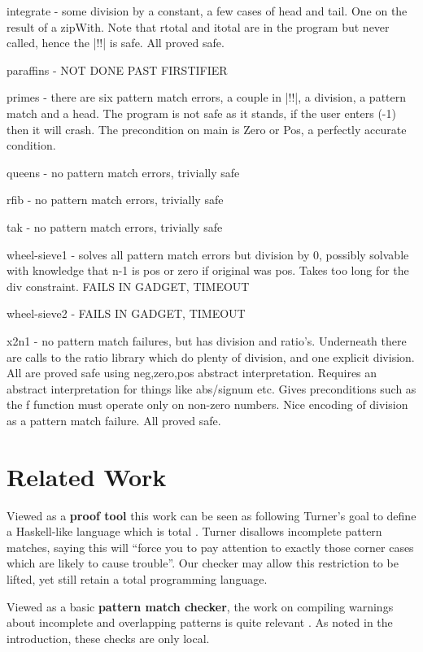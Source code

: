 \documentclass[preprint]{sigplanconf}
\newcommand{\C}[1]{\textsf{#1}}
\begin{document}
integrate - some division by a constant, a few cases of head and tail. One on the result of a zipWith. Note that \C{rtotal} and \C{itotal} are in the program but never called, hence the |!!| is safe. All proved safe.

paraffins - NOT DONE PAST FIRSTIFIER

primes - there are six pattern match errors, a couple in |!!|, a division, a pattern match and a head. The program is not safe as it stands, if the user enters (-1) then it will crash. The precondition on \C{main} is Zero or Pos, a perfectly accurate condition.

queens - no pattern match errors, trivially safe

rfib - no pattern match errors, trivially safe

tak - no pattern match errors, trivially safe

wheel-sieve1 - solves all pattern match errors but division by 0, possibly solvable with knowledge that n-1 is pos or zero if original was pos. Takes too long for the div constraint. FAILS IN GADGET, TIMEOUT

wheel-sieve2 - FAILS IN GADGET, TIMEOUT

x2n1 - no pattern match failures, but has division and ratio's. Underneath there are calls to the ratio library which do plenty of division, and one explicit division. All are proved safe using neg,zero,pos abstract interpretation. Requires an abstract interpretation for things like abs/signum etc. Gives preconditions such as the f function must operate only on non-zero numbers. Nice encoding of division as a pattern match failure. All proved safe.

\section{Related Work}
\label{sec:related}

Viewed as a \textbf{proof tool} this work can be seen as following Turner's goal to define a Haskell-like language which is total \cite{tfp:total}. Turner disallows incomplete pattern matches, saying this will ``force you to pay attention to exactly those corner cases which are likely to cause trouble''. Our checker may allow this restriction to be lifted, yet still retain a total programming language.

Viewed as a basic \textbf{pattern match checker}, the work on compiling warnings about incomplete and overlapping patterns is quite relevant \cite{ghc,pattern_match}. As noted in the introduction, these checks are only local.
\end{document}
